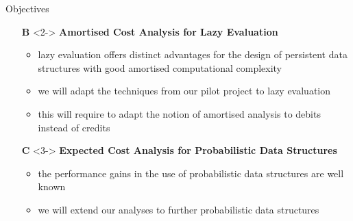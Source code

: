 \documentclass[
11pt,
usepdftitle=false,
aspectratio=169,
xcolor={table,usenames,dvipsnames},
]{beamer}
\newenvironment{mybox}[1]{\begin{block}{#1}}{\end{block}}
\begin{document}
\begin{frame}
\begin{mybox}{Objectives}
\begin{enumerate}
    \item[\textbf{B}]<2-> \textbf{Amortised Cost Analysis for Lazy Evaluation}
      \begin{itemize}
      \item lazy evaluation offers distinct advantages for the design of \alert{persistent} data structures with good amortised computational complexity
      \item we will adapt the techniques from our pilot project to lazy evaluation
      \item this will require to adapt the notion of amortised analysis to \alert{debits} instead of \alert{credits}
      \end{itemize}
      
      \smallskip
    \item[\textbf{C}]<3-> \textbf{Expected Cost Analysis for Probabilistic Data Structures}
      \begin{itemize}
      \item the performance gains in the use of probabilistic data structures are well known
      \item we will extend our analyses to further probabilistic data structures
      \end{itemize}

    \end{enumerate}
  \end{mybox}
\end{frame}
\end{document}
